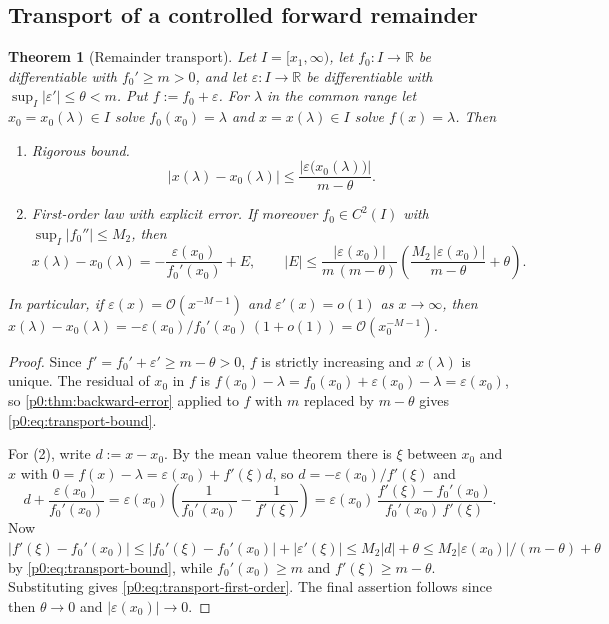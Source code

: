 \documentclass[11pt,a4paper,oneside]{book}
\theoremstyle{plain}
\newtheorem{theorem}{Theorem}[chapter]
\theoremstyle{definition}
\theoremstyle{remark}
\newcommand{\Real}{\mathbb{R}}
\newcommand{\bigO}{\mathcal{O}}
\newcommand{\littleo}{o}
\begin{document}
\subsection{Transport of a controlled forward remainder}

\begin{theorem}[Remainder transport]\label{p0:thm:remainder-transport}
Let $I=[x_1,\infty)$, let $f_0:I\to\Real$ be differentiable with
$f_0'\ge m>0$, and let $\varepsilon:I\to\Real$ be differentiable with
$\sup_I|\varepsilon'|\le\theta<m$.  Put $f:=f_0+\varepsilon$.  For $\lambda$ in
the common range let $x_0=x_0(\lambda)\in I$ solve $f_0(x_0)=\lambda$ and
$x=x(\lambda)\in I$ solve $f(x)=\lambda$.  Then
\begin{enumerate}
\item \emph{Rigorous bound.}
      \begin{equation}\label{p0:eq:transport-bound}
       \bigl|x(\lambda)-x_0(\lambda)\bigr|
       \le\frac{\bigl|\varepsilon\bigl(x_0(\lambda)\bigr)\bigr|}{m-\theta}.
      \end{equation}
\item \emph{First-order law with explicit error.}  If moreover $f_0\in C^2(I)$
      with $\sup_I|f_0''|\le M_2$, then
      \begin{equation}\label{p0:eq:transport-first-order}
       x(\lambda)-x_0(\lambda)
       =-\frac{\varepsilon(x_0)}{f_0'(x_0)}+E,
       \qquad
       |E|\le\frac{|\varepsilon(x_0)|}{m\,(m-\theta)}
        \left(\frac{M_2\,|\varepsilon(x_0)|}{m-\theta}+\theta\right).
      \end{equation}
\end{enumerate}
In particular, if $\varepsilon(x)=\bigO(x^{-M-1})$ and
$\varepsilon'(x)=\littleo(1)$ as $x\to\infty$, then
$x(\lambda)-x_0(\lambda)=-\varepsilon(x_0)/f_0'(x_0)\,(1+\littleo(1))
=\bigO(x_0^{-M-1})$.
\end{theorem}

\begin{proof}
Since $f'=f_0'+\varepsilon'\ge m-\theta>0$, $f$ is strictly increasing and
$x(\lambda)$ is unique.  The residual of $x_0$ in $f$ is
$f(x_0)-\lambda=f_0(x_0)+\varepsilon(x_0)-\lambda=\varepsilon(x_0)$, so
\cref{p0:thm:backward-error} applied to $f$ with $m$ replaced by $m-\theta$
gives \eqref{p0:eq:transport-bound}.

For (2), write $d:=x-x_0$.  By the mean value theorem there is $\xi$ between
$x_0$ and $x$ with $0=f(x)-\lambda=\varepsilon(x_0)+f'(\xi)d$, so
$d=-\varepsilon(x_0)/f'(\xi)$ and
\[
 d+\frac{\varepsilon(x_0)}{f_0'(x_0)}
 =\varepsilon(x_0)\left(\frac1{f_0'(x_0)}-\frac1{f'(\xi)}\right)
 =\varepsilon(x_0)\,\frac{f'(\xi)-f_0'(x_0)}{f_0'(x_0)\,f'(\xi)} .
\]
Now $|f'(\xi)-f_0'(x_0)|\le|f_0'(\xi)-f_0'(x_0)|+|\varepsilon'(\xi)|
\le M_2|d|+\theta\le M_2|\varepsilon(x_0)|/(m-\theta)+\theta$ by
\eqref{p0:eq:transport-bound}, while $f_0'(x_0)\ge m$ and
$f'(\xi)\ge m-\theta$.  Substituting gives
\eqref{p0:eq:transport-first-order}.  The final assertion follows since then
$\theta\to0$ and $|\varepsilon(x_0)|\to0$.
\end{proof}
\end{document}
